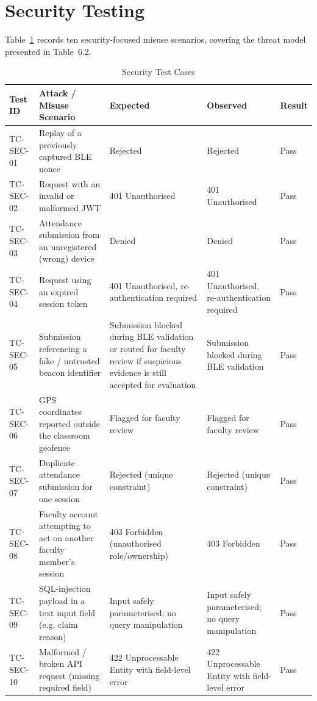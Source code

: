 \documentclass[12pt, a4paper, oneside]{report}
\begin{document}
\section{Security Testing}

Table~\ref{tab:security-tests} records ten security-focused misuse scenarios, covering the threat model presented in Table~6.2.

\begin{table}[p]
\centering
\caption{Security Test Cases}
\label{tab:security-tests}
\tiny
\setlength{\tabcolsep}{3pt}
\renewcommand{\arraystretch}{1.03}
\begin{tabularx}{\textwidth}{|p{1.8cm}|X|X|X|p{0.9cm}|}
\hline
\textbf{Test ID} & \textbf{Attack / Misuse Scenario} & \textbf{Expected} & \textbf{Observed} & \textbf{Result} \\
\hline
TC-SEC-01 & Replay of a previously captured BLE nonce & Rejected & Rejected & Pass \\
\hline
TC-SEC-02 & Request with an invalid or malformed JWT & 401 Unauthorised & 401 Unauthorised & Pass \\
\hline
TC-SEC-03 & Attendance submission from an unregistered (wrong) device & Denied & Denied & Pass \\
\hline
TC-SEC-04 & Request using an expired session token & 401 Unauthorised, re-authentication required & 401 Unauthorised, re-authentication required & Pass \\
\hline
TC-SEC-05 & Submission referencing a fake / untrusted beacon identifier & Submission blocked during BLE validation or routed for faculty review if suspicious evidence is still accepted for evaluation & Submission blocked during BLE validation & Pass \\
\hline
TC-SEC-06 & GPS coordinates reported outside the classroom geofence & Flagged for faculty review & Flagged for faculty review & Pass \\
\hline
TC-SEC-07 & Duplicate attendance submission for one session & Rejected (unique constraint) & Rejected (unique constraint) & Pass \\
\hline
TC-SEC-08 & Faculty account attempting to act on another faculty member's session & 403 Forbidden (unauthorised role/ownership) & 403 Forbidden & Pass \\
\hline
TC-SEC-09 & SQL-injection payload in a text input field (e.g. claim reason) & Input safely parameterised; no query manipulation & Input safely parameterised; no query manipulation & Pass \\
\hline
TC-SEC-10 & Malformed / broken API request (missing required field) & 422 Unprocessable Entity with field-level error & 422 Unprocessable Entity with field-level error & Pass \\
\hline
\end{tabularx}
\end{table}
\end{document}
